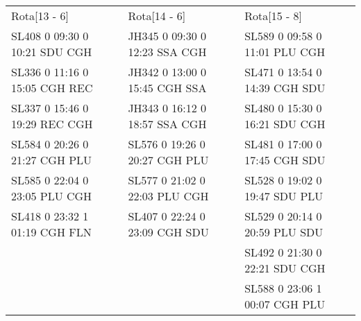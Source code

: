 \begin{scriptsize}
\begin{longtable}{l l l}
Rota[13 - 6]  & Rota[14 - 6]  & Rota[15 - 8] \\
SL408  0 09:30 0 10:21 SDU CGH & JH345  0 09:30 0 12:23 SSA CGH & SL589  0 09:58 0 11:01 PLU CGH\\
SL336  0 11:16 0 15:05 CGH REC & JH342  0 13:00 0 15:45 CGH SSA & SL471  0 13:54 0 14:39 CGH SDU\\
SL337  0 15:46 0 19:29 REC CGH & JH343  0 16:12 0 18:57 SSA CGH & SL480  0 15:30 0 16:21 SDU CGH\\
SL584  0 20:26 0 21:27 CGH PLU & SL576  0 19:26 0 20:27 CGH PLU & SL481  0 17:00 0 17:45 CGH SDU\\
SL585  0 22:04 0 23:05 PLU CGH & SL577  0 21:02 0 22:03 PLU CGH & SL528  0 19:02 0 19:47 SDU PLU\\
SL418  0 23:32 1 01:19 CGH FLN & SL407  0 22:24 0 23:09 CGH SDU & SL529  0 20:14 0 20:59 PLU SDU\\
 &  & SL492  0 21:30 0 22:21 SDU CGH\\
 &  & SL588  0 23:06 1 00:07 CGH PLU\\


\end{longtable}

\end{scriptsize}